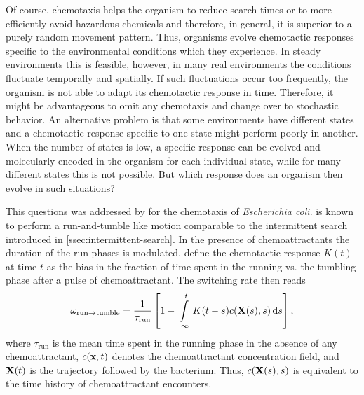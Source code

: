 Of course, chemotaxis helps the organism to reduce search times or to more efficiently avoid hazardous chemicals and therefore, in general, it is superior to a purely random movement pattern. Thus, organisms evolve chemotactic responses specific to the environmental conditions which they experience. In steady environments this is feasible, however, in many real environments the conditions fluctuate temporally and spatially. If such fluctuations occur too frequently, the organism is not able to adapt its chemotactic response in time. Therefore, it might be advantageous to omit any chemotaxis and change over to stochastic behavior. An alternative problem is that some environments have different states and a chemotactic response specific to one state might perform poorly in another. When the number of states is low, a specific response can be evolved and molecularly encoded in the organism for each individual state, while for many different states this is not possible. But which response does an organism then evolve in such situations?

This questions was addressed by  for the chemotaxis of \textit{Escherichia coli}. \ecoli is known to perform a run-and-tumble like motion comparable to the intermittent search introduced in \autoref{ssec:intermittent-search}. In the presence of chemoattractants the duration of the run phases is modulated. \citeauthor{celani:2010} define the chemotactic response $K(t)$ at time $t$ as the bias in the fraction of time spent in the running vs. the tumbling phase after a pulse of chemoattractant. The switching rate then reads
\begin{equation}
 \omega_{\textrm{run} \rightarrow \textrm{tumble}} = \frac{1}{\tau_\textrm{run}}\left[1-\int\limits^t_{-\infty} K(t-s) c(\mathbf{X}(s), s) \mathop{}\!\mathrm{d} s\right],
\end{equation}
where $\tau_\textrm{run}$ is the mean time spent in the running phase in the absence of any chemoattractant, $c(\mathbf{x}, t)$ denotes the chemoattractant concentration field, and $\mathbf{X}(t)$ is the trajectory followed by the bacterium. Thus, $c(\mathbf{X}(s), s)$ is equivalent to the time history of chemoattractant encounters.

